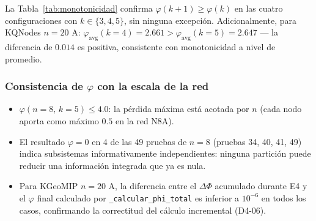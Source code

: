 La Tabla~\ref{tab:monotonicidad} confirma $\varphi(k{+}1) \geq \varphi(k)$
en las cuatro configuraciones con $k \in \{3,4,5\}$, sin ninguna excepción.
Adicionalmente, para KQNodes $n=20$ A: $\varphi_{\mathrm{avg}}(k{=}4) =
2.661 > \varphi_{\mathrm{avg}}(k{=}5) = 2.647$ — la diferencia de
$0.014$ es positiva, consistente con monotonicidad a nivel de promedio.

\subsubsection*{Consistencia de $\varphi$ con la escala de la red}

\begin{itemize}
  \item $\varphi(n{=}8,\, k{=}5) \leq 4.0$: la pérdida máxima está acotada
        por $n$ (cada nodo aporta como máximo $0.5$ en la red N8A).

  \item El resultado $\varphi = 0$ en 4 de las 49 pruebas de $n=8$
        (pruebas 34, 40, 41, 49) indica subsistemas informativamente
        independientes: ninguna partición puede reducir una información
        integrada que ya es nula.

  \item Para KGeoMIP $n=20$ A, la diferencia entre el $\Delta\Phi$
        acumulado durante E4 y el $\varphi$ final calculado por
        \texttt{\_calcular\_phi\_total} es inferior a $10^{-6}$ en todos
        los casos, confirmando la correctitud del cálculo incremental (D4-06).
\end{itemize}
